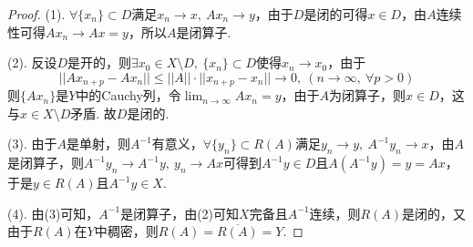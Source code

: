 \documentclass[12pt, a4paper, oneside]{ctexart}
\let\leq=\leqslant %
\def\ol{\overline}          %
\begin{document}
\begin{proof}
    (1). $\forall \{x_n\}\subset D$满足$x_n\to x,\ Ax_n\to y$，由于$D$是闭的可得$x\in D$，由$A$连续性可得$Ax_n\to Ax = y$，所以$A$是闭算子.

    (2). 反设$D$是开的，则$\exists x_0\in X\setminus D,\ \{x_n\}\subset D$使得$x_n\to x_0$，由于
    \begin{equation*}
        ||Ax_{n+p}-Ax_n||\leq ||A||\cdot ||x_{n+p}-x_n||\to 0,\ (n\to\infty,\ \forall p > 0)
    \end{equation*}
    则$\{Ax_n\}$是$Y$中的Cauchy列，令$\lim_{n\to\infty}Ax_n = y$，由于$A$为闭算子，则$x\in D$，这与$x\in X\setminus D$矛盾. 故$D$是闭的.

    (3). 由于$A$是单射，则$A^{-1}$有意义，$\forall \{y_n\}\subset R(A)$满足$y_n\to y,\ A^{-1}y_n\to x$，由$A$是闭算子，则$A^{-1}y_n\to A^{-1}y,\ y_n\to Ax$可得到$A^{-1}y\in D$且$A(A^{-1}y)=y=Ax$，于是$y\in R(A)$且$A^{-1}y\in X$.

    (4). 由(3)可知，$A^{-1}$是闭算子，由(2)可知$X$完备且$A^{-1}$连续，则$R(A)$是闭的，又由于$R(A)$在$Y$中稠密，则$R(A) = \ol{R(A)} = Y$.
\end{proof}
\iffalse
\centerline{
    \texttt{[image: figure.png]}
}
\renewcommand\arraystretch{0.8} %
\begin{table}[!htbp] %
    \centering %
    \begin{tabular}{p{1cm}<{\centering}p{1cm}<{\centering}p{3cm}<{\centering}p{5cm}<{\centering}} %
        \toprule
        $x_i$ & $f[x_1]$ & $f[x_i,x_{i+1}]$ & $f[x_i,x_{i+1},x_{i+2}]$ \\
        \midrule
        $x_0$ & $f(x_0)$ &                  &                          \\
        $x_0$ & $f(x_0)$ & $f'(x_0)$        &                          \\
        $x_0$ & $f(x_1)$ & $\frac{f(x_1)-f(x_0)}{x_1-x_0}$ & $\frac{f(x_1)-f(x_0)}{(x_1-x_0)^2}-\frac{f'(x_0)}{x_1-x_0}$\\
        \bottomrule
    \end{tabular}
\end{table}

\def\Log{\text{Log}} %
$\Log$ %
\fi
\end{document}

